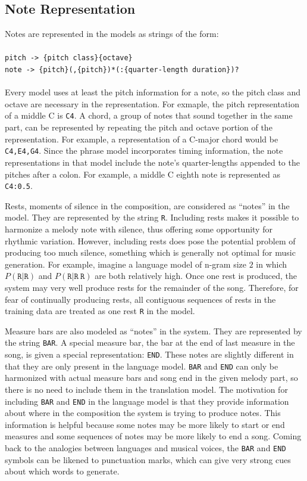 \documentclass{sig-alternate}
\begin{document}
\subsection{Note Representation}
Notes are represented in the models as strings of the form:\\
\\
\texttt{pitch -> \{pitch class\}\{octave\}}\\
\texttt{note -> \{pitch\}(,\{pitch\})*(:\{quarter-length duration\})?}\\
\\
Every model uses at least the pitch information for a note, so the pitch class and octave are necessary in the representation. For exmaple, the pitch representation of a middle C is \texttt{C4}. A chord, a group of notes that sound together in the same part, can be represented by repeating the pitch and octave portion of the representation. For example, a representation of a C-major chord would be \texttt{C4,E4,G4}. Since the phrase model incorporates timing information, the note representations in that model include the note's quarter-lengths appended to the pitches after a colon. For example, a middle C eighth note is represented as \texttt{C4:0.5}.

Rests, moments of silence in the composition, are considered as ``notes'' in the model. They are represented by the string \texttt{R}. Including rests makes it possible to harmonize a melody note with silence, thus offering some opportunity for rhythmic variation. However, including rests does pose the potential problem of producing too much silence, something which is generally not optimal for music generation. For example, imagine a language model of n-gram size $2$ in which $P(\texttt{R} | \texttt{R})$ and $P (\texttt{R} | \texttt{R}\ \texttt{R})$ are both relatively high. Once one rest is produced, the system may very well produce rests for the remainder of the song. Therefore, for fear of continually producing rests, all contiguous sequences of rests in the training data are treated as one rest \texttt{R} in the model.

Measure bars are also modeled as ``notes'' in the system. They are represented by the string \texttt{BAR}. A special measure bar, the bar at the end of last measure in the song, is given a special representation: \texttt{END}. These notes are slightly different in that they are only present in the language model. \texttt{BAR} and \texttt{END} can only be harmonized with actual measure bars and song end in the given melody part, so there is no need to include them in the translation model. The motivation for including \texttt{BAR} and \texttt{END} in the language model is that they provide information about where in the composition the system is trying to produce notes. This information is helpful because some notes may be more likely to start or end measures and some sequences of notes may be more likely to end a song. Coming back to the analogies between languages and musical voices, the \texttt{BAR} and \texttt{END} symbols can be likened to punctuation marks, which can give very strong cues about which words to generate.
\end{document}
